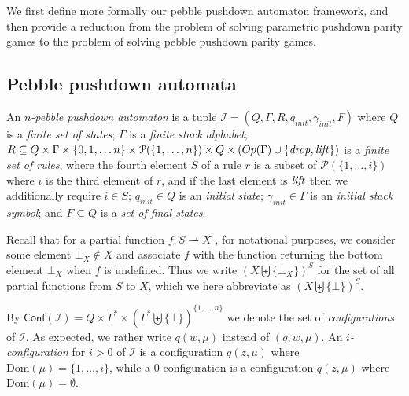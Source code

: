 \documentclass[a4paper,UKenglish,cleveref, autoref, thm-restate]{lipics-v2021}
\newcommand\mh[1]{\todo[inline,size=\scriptsize]{#1 - \textbf{Mathieu}}}
\newcommand{\Conf}{\mathsf{Conf}}
\newcommand{\Op}{\mathsf{Op}}
\begin{document}
We first define more formally our pebble pushdown automaton framework, and then provide a reduction from the problem of solving parametric pushdown parity games to the problem of solving pebble pushdown parity games.



\subsection{Pebble pushdown automata}

\newcommand{\ppda}{\mathcal{I}}

An {\em $n$-pebble pushdown automaton} 
is a tuple 
$\ppda = (Q, \Gamma,  R, q_{init}, \gamma_{init}, F)$
where $Q$ is a {\em finite set of  states}; $\Gamma$ is a {\em finite stack alphabet};
  $R  \subseteq  Q  \times \Gamma \times
		 \{ 0, 1, \ldots n\} \times \mathcal{P}(\{1,\ldots,n\})
		 \times Q  \times (\Op(\Gamma) \cup \{\text{\textit{drop}}, \text{\textit{lift}}\})$ is a {\em finite set of rules},
		 where the fourth element $S$ of a rule $r$ is a subset of 
		$\mathcal{P}(\{1,\ldots,i\})$ where $i$ is the third element of $r$,
		and if the last element is
		$\text{\textit{lift}}$ then we additionally require $i \in S$;
 $q_{init} \in Q$ is an {\em initial  state};
 $\gamma_{init} \in \Gamma$ is an {\em initial stack symbol}; and
 $F \subseteq Q$ is a {\em set of final  states}.


 
 
\par\noindent\ignorespacesafterend 
Recall that for a partial function $ f : S \rightharpoonup X $%
, for notational purposes, we consider some element $\bot_X \not\in X$ and 
 associate $f$ with the function returning the 
bottom element $\bot_X$ when $f$ is undefined. Thus we write $(X \biguplus \{ \bot_X \})^S$ for the set of all partial functions from $S$ to $X$, which we here abbreviate as $(X \biguplus \{ \bot \})^S$. 


 
 
By $\Conf(\ppda)=Q\times \Gamma^* \times (\Gamma^* \biguplus \{ \bot \})^{\{1, \ldots, n\}}$ we denote the set of
{\em configurations} of $\ppda$. As expected, we rather write $q(w, \mu)$ instead of $(q, w, \mu)$.
An {\em$i$-configuration} for $i > 0$ of $\ppda$ is a configuration $q(z,\mu)$ where
$\text{Dom}(\mu) = \{1, \ldots, i\}$, while a $0$-configuration is a configuration 
 $q(z,\mu)$ where $\text{Dom}(\mu)=\emptyset$.
\end{document}
